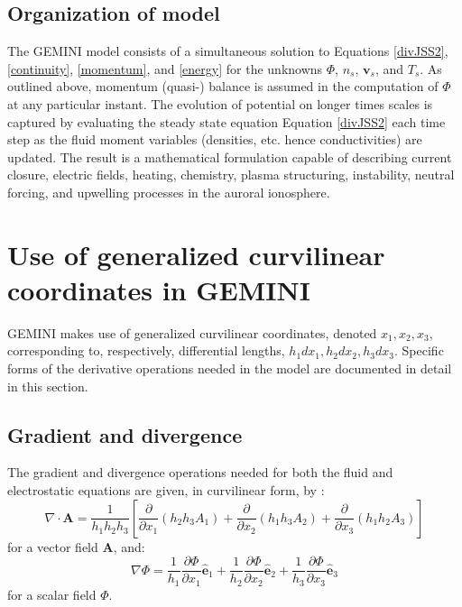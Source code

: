 \documentclass[11pt,letterpaper]{article}
\begin{document}
\subsection{Organization of model}

The GEMINI model consists of a simultaneous solution to Equations \ref{divJSS2}, \ref{continuity}, \ref{momentum}, and \ref{energy} for the unknowns $\Phi$, $n_s$, $\mathbf{v}_s$, and $T_s$.  As outlined above, momentum (quasi-) balance is assumed in the computation of $\Phi$ at any particular instant.  The evolution of potential on longer times scales is captured by evaluating the steady state equation Equation \ref{divJSS2} each time step as the fluid moment variables (densities, etc. hence conductivities) are updated.  The result is a mathematical formulation capable of describing current closure, electric fields, heating, chemistry, plasma structuring, instability, neutral forcing, and upwelling processes in the auroral ionosphere.  

\section{Use of generalized curvilinear coordinates in GEMINI}

GEMINI makes use of generalized curvilinear coordinates, denoted $x_1,x_2,x_3$, corresponding to, respectively, differential lengths, $h_1 dx_1,h_2 dx_2,h_3 dx_3$.  Specific forms of the derivative operations needed in the model are documented in detail in this section.  


\subsection{Gradient and divergence}

The gradient and divergence operations needed for both the fluid and electrostatic equations are given, in curvilinear form, by \citep[e.g.][]{Huba:1998}:
\begin{equation}
\nabla \cdot \mathbf{A} = \frac{1}{h_1 h_2 h_3} \left[ \frac{\partial}{\partial x_1} \left( h_2 h_3 A_1 \right) + \frac{\partial}{\partial x_2} \left( h_1 h_3 A_2 \right) + \frac{\partial}{\partial x_3} \left( h_1 h_2 A_3 \right) \right]
\end{equation}
for a vector field $\mathbf{A}$, and:
\begin{equation}
\nabla \Phi = \frac{1}{h_1} \frac{\partial \Phi}{\partial x_1} \hat{\mathbf{e}}_1 + \frac{1}{h_2} \frac{\partial \Phi}{\partial x_2} \hat{\mathbf{e}}_2 + \frac{1}{h_3} \frac{\partial \Phi}{\partial x_3} \hat{\mathbf{e}}_3
\end{equation}
for a scalar field $\Phi$.  
\end{document}

